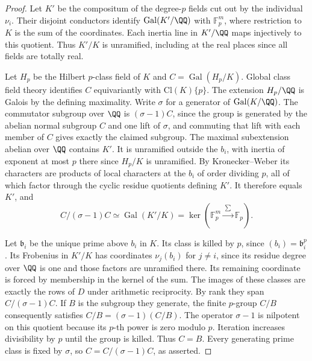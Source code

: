 \documentclass[a4paper,11pt]{article}
\theoremstyle{definition}
\theoremstyle{remark}
\numberwithin{equation}{section}
\begin{document}
\begin{proof}
Let \(K'\) be the compositum of the degree-\(p\) fields cut out
by the individual \(\nu_i\). Their disjoint conductors identify
\(\operatorname{Gal}(K'/\QQ)\) with \(\mathbb F_p^m\), where
restriction to \(K\) is the sum of the coordinates. Each inertia
line in \(K'/\QQ\) maps injectively to this quotient. Thus
\(K'/K\) is unramified, including at the real places since
all fields are totally real.

Let \(H_p\) be the Hilbert \(p\)-class field of \(K\) and
\(C=\operatorname{Gal}(H_p/K)\). Global class field theory
identifies \(C\) equivariantly with \(\mathrm{Cl}(K)\{p\}\).
The extension \(H_p/\QQ\) is Galois by the defining maximality.
Write \(\sigma\) for a generator of \(\operatorname{Gal}(K/\QQ)\).
The commutator subgroup over \(\QQ\) is \((\sigma-1)C\), since
the group is generated by the abelian normal subgroup \(C\)
and one lift of \(\sigma\), and commuting that lift with
each member of \(C\) gives exactly the claimed subgroup.
The maximal subextension abelian over \(\QQ\) contains \(K'\).
It is unramified outside the \(b_i\), with inertia of exponent
at most \(p\) there since \(H_p/K\) is unramified. By
Kronecker--Weber its characters are products of local characters
at the \(b_i\) of order dividing \(p\), all of which factor
through the cyclic residue quotients defining \(K'\).
It therefore equals \(K'\), and
\[
 C/(\sigma-1)C \simeq
   \operatorname{Gal}(K'/K)=
   \ker\!\left(\mathbb F_p^m\xrightarrow{\ \sum\ }\mathbb F_p\right).
\]

Let \(\mathfrak b_i\) be the unique prime above \(b_i\) in \(K\).
Its class is killed by \(p\), since \((b_i)=\mathfrak b_i^p\).
Its Frobenius in \(K'/K\) has coordinates \(\nu_j(b_i)\) for
\(j\ne i\), since its residue degree over \(\QQ\) is one and those
factors are unramified there. Its remaining coordinate is forced
by membership in the kernel of the sum. The images of these
classes are exactly the rows of \(D\) under arithmetic reciprocity.
By rank they span \(C/(\sigma-1)C\). If \(B\) is the subgroup
they generate, the finite \(p\)-group \(C/B\) consequently
satisfies \(C/B=(\sigma-1)(C/B)\). The operator \(\sigma-1\)
is nilpotent on this quotient because its \(p\)-th power
is zero modulo \(p\). Iteration increases divisibility by \(p\) until
the group is killed. Thus \(C=B\). Every generating prime class
is fixed by \(\sigma\), so \(C=C/(\sigma-1)C\), as asserted.
\end{proof}
\end{document}
